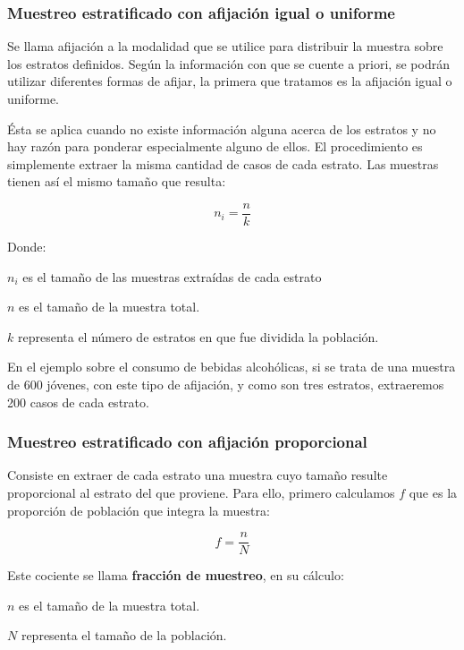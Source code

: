 \documentclass[]{book}
\begin{document}
\hypertarget{muestreo-estratificado-con-afijaciuxf3n-igual-o-uniforme}{%
\subsubsection{Muestreo estratificado con afijación igual o uniforme}\label{muestreo-estratificado-con-afijaciuxf3n-igual-o-uniforme}}

Se llama afijación a la modalidad que se utilice para distribuir la
muestra sobre los estratos definidos. Según la información con que se
cuente a priori, se podrán utilizar diferentes formas de afijar, la
primera que tratamos es la afijación igual o uniforme.

Ésta se aplica cuando no existe información alguna acerca de los
estratos y no hay razón para ponderar especialmente alguno de ellos. El
procedimiento es simplemente extraer la misma cantidad de casos de cada
estrato. Las muestras tienen así el mismo tamaño que resulta:

\[n_{i} = \frac{n}{k}\]

Donde:

\(n_{i}\) es el tamaño de las muestras extraídas de cada estrato

\(n\) es el tamaño de la muestra total.

\(k\) representa el número de estratos en que fue dividida la población.

En el ejemplo sobre el consumo de bebidas alcohólicas, si se trata de
una muestra de 600 jóvenes, con este tipo de afijación, y como son tres
estratos, extraeremos 200 casos de cada estrato.

\hypertarget{muestreo-estratificado-con-afijaciuxf3n-proporcional}{%
\subsubsection{Muestreo estratificado con afijación proporcional}\label{muestreo-estratificado-con-afijaciuxf3n-proporcional}}

Consiste en extraer de cada estrato una muestra cuyo tamaño resulte
proporcional al estrato del que proviene. Para ello, primero calculamos \(f\)
que es la proporción de población que integra la muestra:

\[f = \frac{n}{N}\]

Este cociente se llama \textbf{fracción de muestreo}, en su cálculo:

\(n\) es el tamaño de la muestra total.

\(N\) representa el tamaño de la población.
\end{document}
